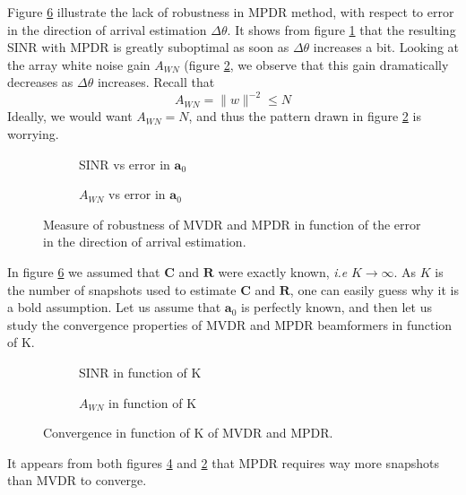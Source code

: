 \documentclass[12pt]{article}
\begin{document}
Figure \ref{fig:mpdr_robust} illustrate the lack of robustness in MPDR method, with respect to error in the direction of arrival estimation $\Delta\theta$. It shows from figure \ref{fig:mpdr_robus_sinr} that the resulting SINR with MPDR is greatly suboptimal as soon as $\Delta\theta$ increases a bit. Looking at the array white noise gain $A_{WN}$ (figure \ref{fig:mpdr_robus_awn}, we observe that this gain dramatically decreases as $\Delta\theta$ increases. Recall that 
\begin{equation}
    A_{WN} = \|w\|^{-2} \leq N
\end{equation}
Ideally, we would want $A_{WN}=N$, and thus the pattern drawn in figure \ref{fig:mpdr_robus_awn} is worrying.
\begin{figure}[H]
    \centering
    \begin{subfigure}[b]{.4\linewidth}
        
        \caption{SINR vs error in $\mathbf{a}_0$}
        \label{fig:mpdr_robus_sinr}
    \end{subfigure}\hspace{0.09\linewidth}
    \begin{subfigure}[b]{.4\linewidth}
        
        \caption{$A_{WN}$ vs error in $\mathbf{a}_0$}
        \label{fig:mpdr_robus_awn}
    \end{subfigure}
    \caption{Measure of robustness of MVDR and MPDR in function of the error in the direction of arrival estimation.}
    \label{fig:mpdr_robust}
\end{figure}
In figure \ref{fig:mpdr_robust} we assumed that $\mathbf{C}$ and $\mathbf{R}$ were exactly known, \textit{i.e} $K\rightarrow\infty$. As $K$ is the number of snapshots used to estimate $\mathbf{C}$ and $\mathbf{R}$, one can easily guess why it is a bold assumption. Let us assume that $\mathbf{a}_0$ is perfectly known, and then let us study the convergence properties of MVDR and MPDR beamformers in function of K.

\begin{figure}[H]
    \centering
    \begin{subfigure}[b]{.4\linewidth}
        
        \caption{SINR in function of K}
        \label{fig:robust_k_sinr}
    \end{subfigure}\hspace{0.09\linewidth}
    \begin{subfigure}[b]{.4\linewidth}
        
        \caption{$A_{WN}$ in function of K}
        \label{fig:robust_k_awn}
    \end{subfigure}
    \caption{Convergence in function of K of MVDR and MPDR.}
    \label{fig:mpdr_robust}
\end{figure}

It appears from both figures \ref{fig:robust_k_sinr} and \ref{fig:mpdr_robus_awn} that MPDR requires way more snapshots than MVDR to converge. 
\end{document}
